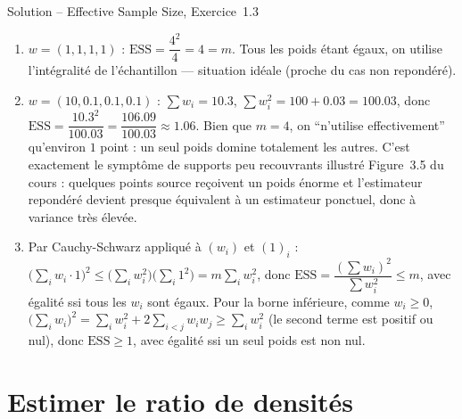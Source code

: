 \documentclass[11pt]{article}
\begin{document}
\begin{exercisebox}{Solution -- Effective Sample Size, Exercice~1.3}
\begin{enumerate}[label=(\alph*)]
\item $w=(1,1,1,1)$ : $\mathrm{ESS}=\dfrac{4^2}{4}=4=m$. Tous les poids étant égaux, on utilise
l'intégralité de l'échantillon --- situation idéale (proche du cas non repondéré).
\item $w=(10,0.1,0.1,0.1)$ : $\sum w_i=10.3$, $\sum w_i^2 = 100+0.03=100.03$, donc
$\mathrm{ESS}=\dfrac{10.3^2}{100.03}=\dfrac{106.09}{100.03}\approx 1.06$. Bien que $m=4$, on
\enquote{n'utilise effectivement} qu'environ $1$ point : un seul poids domine totalement les autres. C'est
exactement le symptôme de supports peu recouvrants illustré Figure~3.5 du cours : quelques points source
reçoivent un poids énorme et l'estimateur repondéré devient presque équivalent à un estimateur ponctuel,
donc à variance très élevée.
\item Par Cauchy-Schwarz appliqué à $(w_i)$ et $(1)_i$ : $\big(\sum_i w_i \cdot 1\big)^2 \le
\big(\sum_i w_i^2\big)\big(\sum_i 1^2\big) = m\sum_i w_i^2$, donc $\mathrm{ESS}=\dfrac{(\sum w_i)^2}{\sum
w_i^2}\le m$, avec égalité ssi tous les $w_i$ sont égaux. Pour la borne inférieure, comme $w_i\ge 0$,
$\big(\sum_i w_i\big)^2 = \sum_i w_i^2 + 2\sum_{i<j}w_iw_j \ge \sum_i w_i^2$ (le second terme est positif
ou nul), donc $\mathrm{ESS}\ge 1$, avec égalité ssi un seul poids est non nul.
\end{enumerate}
\end{exercisebox}

\section{Estimer le ratio de densités}
\end{document}
